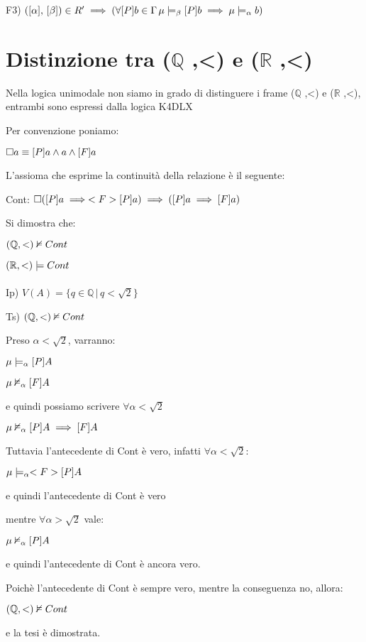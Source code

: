 F3) $([\alpha],\,[\beta])\in R'\implies(\forall[P]b\in\Gamma\,\mu\models_{\beta}[P]b\implies\mu\models_{\alpha}b)$


\section{Distinzione tra ($\mathbb{Q}$ ,<) e ($\mathbb{R}$ ,<)}

Nella logica unimodale non siamo in grado di distinguere i frame ($\mathbb{Q}$
,<) e ($\mathbb{R}$ ,<), entrambi sono espressi dalla logica K4DLX

Per convenzione poniamo:

$\square a\equiv[P]a\wedge a\wedge[F]a$

L'assioma che esprime la continuità della relazione è il seguente:

Cont: $\square([P]a\implies<F>[P]a)\implies([P]a\implies[F]a)$

Si dimostra che:

$(\mathbb{Q},<)\nvDash Cont$

$(\mathbb{R},<)\models Cont$\\
\\
Ip) $V(A)=\{q\in\mathbb{Q}\,|\, q<\sqrt{2}\}$

Ts) $(\mathbb{Q},<)\nvDash Cont$

Preso $\alpha<\sqrt{2}$, varranno:

$\mu\models_{\alpha}[P]A$

$\mu\nvDash_{\alpha}[F]A$

e quindi possiamo scrivere $\forall\alpha<\sqrt{2}$

$\mu\nvDash_{\alpha}[P]A\implies[F]A$

Tuttavia l'antecedente di Cont è vero, infatti $\forall\alpha<\sqrt{2}$:

$\mu\models_{\alpha}<F>[P]A$ 

e quindi l'antecedente di Cont è vero

mentre $\forall\alpha>\sqrt{2}$ vale:

$\mu\nvDash_{\alpha}[P]A$

e quindi l'antecedente di Cont è ancora vero.

Poichè l'antecedente di Cont è sempre vero, mentre la conseguenza
no, allora:

$(\mathbb{Q},<)\nvDash Cont$

e la tesi è dimostrata.\\


